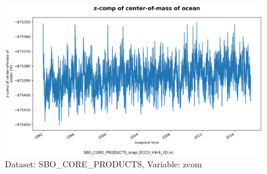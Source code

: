\begin{figure}[H]
\centering
\includegraphics[scale=0.55]{../images/plots/oneD_plots/SBO_Core_Products/zcom.png}
\caption{Dataset: SBO\_CORE\_PRODUCTS, Variable: zcom}
\label{tab:table-SBO_CORE_PRODUCTS_zcom-Plot}
\end{figure}
\pagebreak
